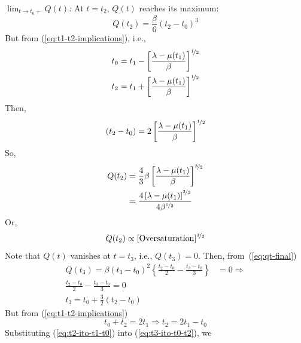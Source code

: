 \documentclass[12pt]{report}
\newcounter{space}
\begin{document}
\vspace{1em}\noindent\emph{$\lim_{t\to t_0+} Q(t)$:}
At $t=t_2$, $Q(t)$ reaches its maximum:
\begin{equation}
  \label{eq:max-qt}
  Q(t_2) =\frac{\beta}{6}(t_2-t_0)^3
\end{equation}
But from (\ref{eq:t1-t2-implications}), i.e.,
\begin{equation*}
  \begin{split}
    t_0 & = t_1 - \left[\frac{\lambda-\mu(t_1)}{\beta}\right]^{\nicefrac{1}{2}}\\
    t_2 & = t_1  + \left[\frac{\lambda-\mu(t_1)}{\beta}\right]^{\nicefrac{1}{2}}
  \end{split}
\end{equation*}
Then,
\begin{equation}
  \label{eq:combined-t0-t2}
  (t_2-t_0) = 2\left[\frac{\lambda-\mu(t_1)}{\beta}\right]^{\nicefrac{1}{2}}
\end{equation}
So,
\begin{equation}
  \label{eq:q-t2}
  \begin{split}
    Q(t_2)& = \frac{4}{3}\beta\left[\frac{\lambda-\mu(t_1)}{\beta}\right]^{\nicefrac{3}{2}}\\
    & = \frac{4\left[\lambda-\mu(t_1)\right]^{\nicefrac{3}{2}}}{4\beta^{\nicefrac{1}{2}}} \\
  \end{split}
\end{equation}
Or,
\begin{equation}
  \label{eq:qt-prop-oversat}
  Q(t_2) \propto [\mathrm{Oversaturation}]^{\nicefrac{3}{2}}
\end{equation}
Note that $Q(t)$ vanishes at $t=t_3$, i.e., $Q(t_3)=0$.  Then, from~(\ref{eq:qt-final})
\begin{equation}
  \label{eq:t3-ito-t0-t2}
  \begin{split}
    Q(t_3) =\beta(t_3-t_0)^2\left\{\frac{t_2-t_0}{2}-\frac{t_3-t_0}{3}\right\} & = 0 \Rightarrow  \\
    \frac{t_2-t_0}{2}-\frac{t_3-t_0}{3} = 0 \\
    t_3 = t_0 + \frac{3}{2}(t_2-t_0)
  \end{split}
\end{equation}
But from (\ref{eq:t1-t2-implications})
\begin{equation}
  \label{eq:t2-ito-t1-t0}
  t_0 + t_2 = 2t_1 \Rightarrow t_2 = 2t_1 - t_0
\end{equation}
Substituting (\ref{eq:t2-ito-t1-t0}) into (\ref{eq:t3-ito-t0-t2}), we
\end{document}
